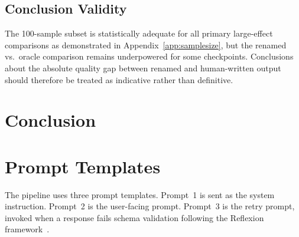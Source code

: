 \documentclass[conference]{IEEEtran}
\begin{document}
\subsection{Conclusion Validity}

The 100-sample subset is statistically adequate for all primary large-effect
comparisons as demonstrated in Appendix~\ref{app:samplesize}, but the renamed
vs.\ oracle comparison remains underpowered for some checkpoints.
Conclusions about the absolute quality gap between renamed and human-written
output should therefore be treated as indicative rather than definitive.

\section{Conclusion}





\appendix

\section{Prompt Templates}
\label{app:prompts}

The pipeline uses three prompt templates.
Prompt~1 is sent as the system instruction.
Prompt~2 is the user-facing prompt.
Prompt~3 is the retry prompt, invoked when a response fails schema validation
following the Reflexion framework~\cite{shinn2023reflexion}.
\end{document}
